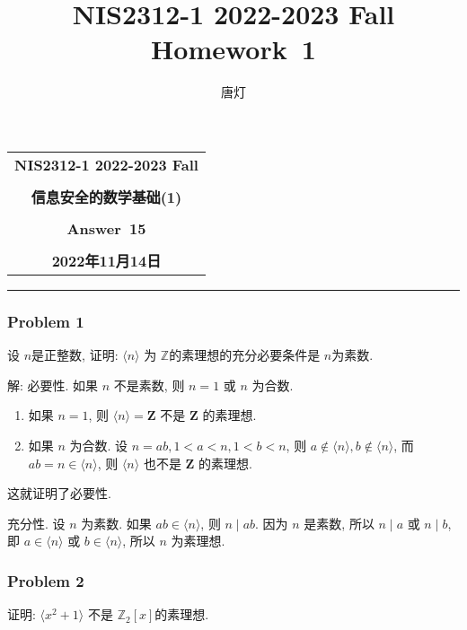 \documentclass[a4paper,12pt]{ctexart}
\title{NIS2312-1 2022-2023 Fall Homework~1}
\author{唐灯}
\newcommand{\Z}{\mathbb{Z}}
\begin{document}
  \begin{center}

  \vspace{-0.3in}
  \begin{tabular}{c}
    \textbf{\Large NIS2312-1 2022-2023 Fall} \\
    \textbf{\Large  } \\
    \textbf{\Large  信息安全的数学基础(1)} \\
    \textbf{\Large  } \\
    \textbf{\Large  Answer~15} \\
    \textbf{\Large  } \\
    \textbf{\Large 2022年11月14日} \\
  \end{tabular}
  \end{center}
  \noindent
  \rule{\linewidth}{0.4pt}
  

\subsubsection*{Problem 1}
    设 $ n $是正整数, 证明: $ \langle n\rangle $ 为 $ \Z $的素理想的充分必要条件是 $ n $为素数.

    解: 
    必要性. 如果 $n$ 不是素数, 则 $n=1$ 或 $n$ 为合数.
    \begin{enumerate}[label=(\arabic{*})]
      \item 如果 $n=1$, 则 $\langle n\rangle=\mathbf{Z}$ 不是 $\mathbf{Z}$ 的素理想.
      \item 如果 $n$ 为合数. 设 $n=a b, 1<a<n, 1<b<n$, 则 $a \notin\langle n\rangle, b \notin\langle n\rangle$, 而 $a b=n \in\langle n\rangle$, 则 $\langle n\rangle$ 也不是 $\mathbf{Z}$ 的素理想.
    \end{enumerate}

      这就证明了必要性.

      充分性. 设 $n$ 为素数. 如果 $a b \in\langle n\rangle$, 则 $n \mid a b$. 因为 $n$ 是素数, 所以 $n \mid a$ 或 $n \mid b$, 即 $a \in\langle n\rangle$ 或 $b \in\langle n\rangle$, 所以 $n$ 为素理想.

\subsubsection*{Problem 2} 
    证明: $ \langle x^2+1\rangle $ 不是 $ \Z_2[x] $的素理想.
  
\end{document}
